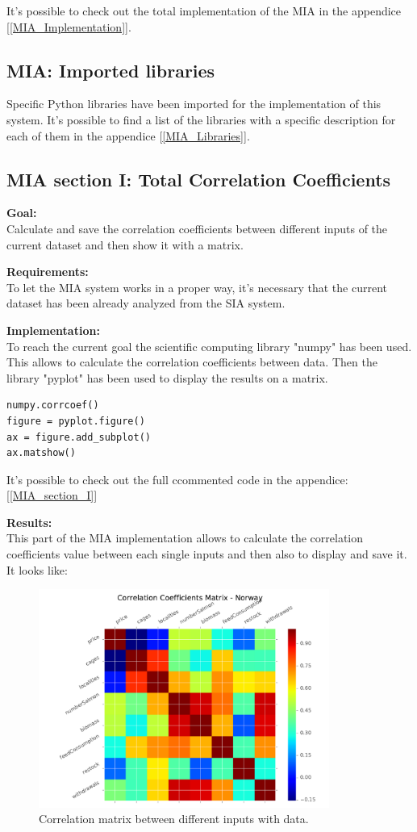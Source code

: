 It's possible to check out the total implementation of the MIA in the appendice  [\ref{MIA_Implementation}].

\subsection{MIA: Imported libraries}
Specific Python libraries have been imported for the implementation of this system.
It's possible to find a list of the libraries with a specific description for each of them in the appendice [\ref{MIA_Libraries}].

\newpage

\subsection{MIA section I: Total Correlation Coefficients}
\textbf{Goal:}\\
Calculate and save the correlation coefficients between different inputs of the current dataset and then show it with a matrix.

\textbf{Requirements:}\\
To let the MIA system works in a proper way, it's necessary that the current dataset has been already analyzed from the SIA system.

\textbf{Implementation:}\\
To reach the current goal the scientific computing library "numpy" has been used. This allows to calculate the correlation coefficients between data. Then the library "pyplot" has been used to display the results on a matrix.
\begin{lstlisting}
numpy.corrcoef()
figure = pyplot.figure()
ax = figure.add_subplot()
ax.matshow()
\end{lstlisting}

It's possible to check out the full ccommented code in the appendice: [\ref{MIA_section_I}]

\textbf{Results:} \\
This part of the MIA implementation allows to calculate the correlation coefficients value between each single inputs and then also to display and save it. It looks like:

\begin{figure}[H]
	\centering
    \includegraphics[width=0.85\textwidth]{Files/Total_Dataset_Matrix.pdf}
    \caption{Correlation matrix between different inputs with data.}
\end{figure}

